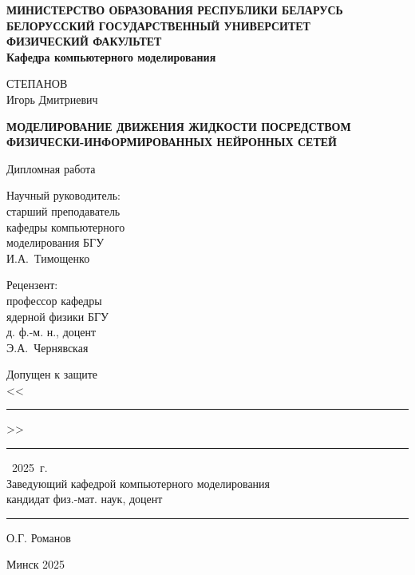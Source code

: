 \thispagestyle{empty}
\begin{center}
\textbf{МИНИСТЕРСТВО ОБРАЗОВАНИЯ РЕСПУБЛИКИ БЕЛАРУСЬ\vspace{7pt}\\
  БЕЛОРУССКИЙ ГОСУДАРСТВЕННЫЙ УНИВЕРСИТЕТ\vspace{7pt}\\
  ФИЗИЧЕСКИЙ ФАКУЛЬТЕТ\vspace{7pt}\\
  Кафедра компьютерного моделирования}
  \vspace{0.5cm}
  
  СТЕПАНОВ\\
  Игорь Дмитриевич
  \vspace{0.5cm}
  
  \textbf{МОДЕЛИРОВАНИЕ ДВИЖЕНИЯ ЖИДКОСТИ ПОСРЕДСТВОМ ФИЗИЧЕСКИ-ИНФОРМИРОВАННЫХ НЕЙРОННЫХ СЕТЕЙ}
  \vspace{0.5cm}

  Дипломная работа
\end{center}
\vspace{0.5cm}
\begin{flushright}
    Научный руководитель:\\
    старший преподаватель\\
    кафедры компьютерного\\ моделирования БГУ\\
    И.А.~Тимощенко
\end{flushright}
\vspace{4pt}

\begin{flushright}
    Рецензент:\\
    профессор кафедры\\
    ядерной физики БГУ\\
    д. ф.-м. н., доцент\\
    Э.А.~Чернявская 
\end{flushright}

\vspace{4pt}
\begin{flushleft}
    Допущен к защите\vspace{7pt}\\    
    <<\rule{0.5cm}{0.5pt}>>\rule{3.5cm}{0.5pt}~2025~г.\vspace{7pt}\\
    Заведующий кафедрой компьютерного моделирования\\
    кандидат физ.-мат. наук, доцент \rule{1.5cm}{0.5pt}О.Г. Романов
\end{flushleft}
\vfill
\begin{center}
  Минск 2025
\end{center}